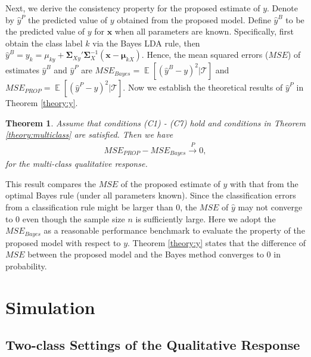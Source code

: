 \documentclass[12pt]{article}
\newtheorem{theorem}{Theorem}%
\DeclareMathOperator{\E}{\mathbb{E}}
\begin{document}
Next, we derive the consistency property for the proposed estimate of $y$.
Denote by $\hat{y}^{P}$ the predicted value of $y$ obtained from the proposed model.
Define $\hat{y}^{B}$ to be the predicted value of $y$ for $\bm x$ when all parameters are known.
Specifically, first obtain the class label $k$ via the Bayes LDA rule, then $\hat{y}^{B} = y_k = \mu_{ky} + \bm \Sigma_{Xy}' \bm \Sigma_{X}^{-1} (\bm x - \bm \mu_{kX})$.
Hence, the mean squared errors ($MSE$) of estimates $\hat{y}^{B}$ and $\hat{y}^{P}$ are $MSE_{Bayes} = \E[(\hat{y}^{B}-y)^2|\mathcal{T}]$ and $MSE_{PROP} = \E[(\hat{y}^{P}-y)^2|\mathcal{T}]$.
Now we establish the theoretical results of $\hat{y}^{P}$ in Theorem \ref{theory:y}.

\begin{theorem}{}{\label{theory:y}}
Assume that conditions (C1) - (C7) hold and conditions in Theorem \ref{theory:multiclass} are satisfied.
Then we have
\begin{align*}
MSE_{PROP} - MSE_{Bayes} \stackrel{P}{\rightarrow} 0,
\end{align*}
for the multi-class qualitative response.
\end{theorem}
This result compares the $MSE$ of the proposed estimate of $y$ with that from the optimal Bayes rule (under all parameters known).
Since the classification errors from a classification rule might be larger than 0,
the $MSE$ of $\hat{y}$ may not converge to 0 even though the sample size $n$ is sufficiently large.
Here we adopt the $MSE_{Bayes}$ as a reasonable performance benchmark to evaluate the property of the proposed model with respect to $y$.
Theorem \ref{theory:y} states that the difference of $MSE$ between the proposed model and the Bayes method converges to 0 in probability.

\section{Simulation}\label{sec:simulation}
\subsection{Two-class Settings of the Qualitative Response}
\end{document}
